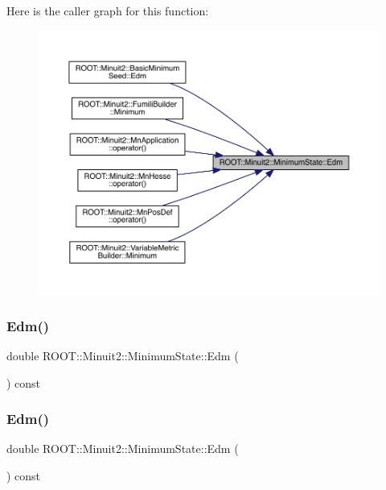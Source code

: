 Here is the caller graph for this function\+:
\nopagebreak
\begin{figure}[H]
\begin{center}
\leavevmode
\includegraphics[width=350pt]{db/dcd/classROOT_1_1Minuit2_1_1MinimumState_a397315b170efca9446f7d6a91bae6c59_icgraph}
\end{center}
\end{figure}
\mbox{\label{classROOT_1_1Minuit2_1_1MinimumState_a397315b170efca9446f7d6a91bae6c59}} 
\subsubsection{\texorpdfstring{Edm()}{Edm()}\hspace{0.1cm}{\footnotesize\ttfamily [2/3]}}
{\footnotesize\ttfamily double R\+O\+O\+T\+::\+Minuit2\+::\+Minimum\+State\+::\+Edm (\begin{DoxyParamCaption}{ }\end{DoxyParamCaption}) const\hspace{0.3cm}{\ttfamily [inline]}}

\mbox{\label{classROOT_1_1Minuit2_1_1MinimumState_a397315b170efca9446f7d6a91bae6c59}} 
\subsubsection{\texorpdfstring{Edm()}{Edm()}\hspace{0.1cm}{\footnotesize\ttfamily [3/3]}}
{\footnotesize\ttfamily double R\+O\+O\+T\+::\+Minuit2\+::\+Minimum\+State\+::\+Edm (\begin{DoxyParamCaption}{ }\end{DoxyParamCaption}) const\hspace{0.3cm}{\ttfamily [inline]}}

